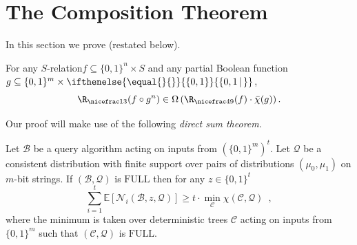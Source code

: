 \documentclass{toc}
\newcommand{\relation}{$S$-relation\xspace}     %
\newcommand{\md}{\middle}
\newcommand{\dr}{\nicefrac}
\newcommand{\set}[2][]{\ifthenelse{\equal{}{#1}}%
{\ensuremath{\left\{#2\right\}}}%
{\ensuremath{\left\{#2\,\md|\,#1\right\}}}}
\newcommand{\OI}{\set{0,1}}
\newcommand{\full}{\text{FULL}}
\newcommand{\clB}{\mathcal{B}}
\newcommand{\clC}{\mathcal{C}}
\newcommand{\clQ}{\mathcal{Q}}
\newcommand{\clN}{\mathcal{N}}
\newcommand{\E}{\mathbb{E}}
\begin{document}
\section{The Composition Theorem}
\label{comp}
In this section we prove  (restated below).
\begin{theorem}
\label{main-restated}
For any \relation $f\subseteq\{0,1\}^n \times S$ and any partial Boolean function
%
$g\subseteq \{0,1\}^m \times \OI$,
\[\R_{\dr13}(f \circ g^n) \in \Omega\left(\R_{\dr49}(f) \cdot \bar \chi(g)\right).\]
\end{theorem}
Our proof will make use of the following \emph{direct sum theorem}.
\begin{theorem}
\label{dp}
Let $\clB$ be a query algorithm acting on inputs from $\left(\{0,1\}^m\right)^t$.  Let $\clQ$ be a consistent distribution with finite support over pairs of distributions $(\mu_0, \mu_1)$ on $m$-bit strings.  If $(\clB, \clQ)$ is $\full$ then for any 
$z \in \{0,1\}^t$
\[
\sum_{i=1}^t \E[\clN_i(\clB, z,\clQ)] \geq t \cdot \min_{\clC} \chi(\clC, \clQ) \enspace,
\]
where the minimum is taken over deterministic trees $\clC$ acting on inputs from $\{0,1\}^m$ such that $(\clC, \clQ)$ is $\full$.
\end{theorem}
\end{document}
